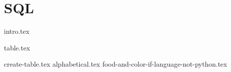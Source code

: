 \documentclass{exam}
\begin{document}
\section{SQL}
{intro.tex}
\newpage

\begin{questions}
  \question
  {table.tex}
  \begin{parts}
    {create-table.tex}
    {alphabetical.tex}
    {food-and-color-if-language-not-python.tex}
  \end{parts}
\end{questions}

\end{document}
